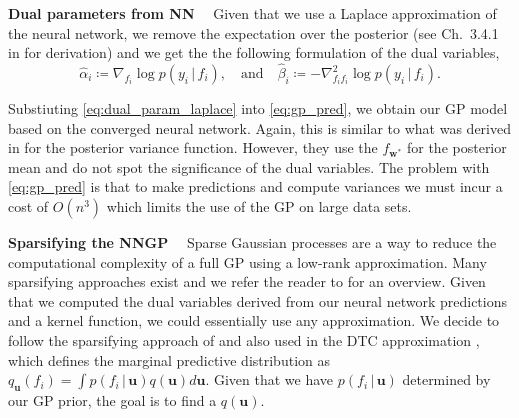 \documentclass{article}
\renewcommand{\paragraph}[1]{{\bf #1}~~}
\newcommand{\mbf}[1]{\mathbf{#1}}
\renewcommand{\mid}{\,|\,}
\newcommand{\vu}{\mbf{u}}
\newcommand{\vw}{\mbf{w}}
\begin{document}
\paragraph{Dual parameters from NN}
Given that we use a Laplace approximation of the neural network, we remove the expectation over the posterior (see Ch.~3.4.1 in \cite{rasmussen2006gaussian} for derivation) and we get the the following formulation of the dual variables,
\begin{equation}
\label{eq:dual_param_laplace}
\hat{\alpha}_i \coloneqq \nabla_{f_i}\log p(y_i \mid f_i),  \quad \text{and} \quad
\hat{\beta}_i \coloneqq - \nabla^2_{f_i f_i}\log p(y_i \mid f_i).
\end{equation}

Substiuting \cref{eq:dual_param_laplace} into \cref{eq:gp_pred}, we obtain our GP model based on the converged neural network. Again, this is similar to what was derived in \citet{immer2021improving} for the posterior variance function. However, they use the $f_{\vw^*}$ for the posterior mean and do not spot the significance of the dual variables. The problem with \cref{eq:gp_pred} is that to make predictions and compute variances we must incur a cost of $O(n^3)$ which limits the use of the GP on large data sets.

\paragraph{Sparsifying the NNGP}
\label{sec:sparse-dual-gp}
%
Sparse Gaussian processes are a way to reduce the computational complexity of a full GP using a low-rank approximation. Many sparsifying approaches exist and we refer the reader to \cite{quinonero2005unifying} for an overview. Given that we computed the dual variables derived from our neural network predictions and a kernel function, we could essentially use any approximation. We decide to follow the sparsifying approach of \citet{titsias2009variational} and also used in the DTC approximation \citep{quinonero2005unifying}, which defines the marginal predictive distribution as $q_{\vu}(f_i)  = \int p(f_i  \mid \vu) q(\vu)  d\vu$. Given that we have $p(f_i  \mid \vu)$ determined by our GP prior, the goal is to find a $q(\vu)$. 
\end{document}
